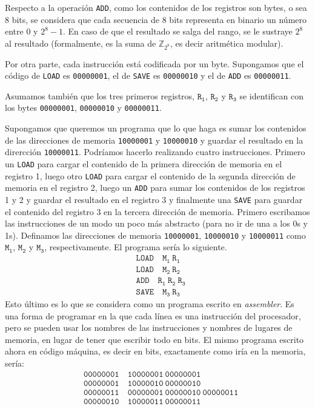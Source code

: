 \documentclass[a4paper, 12pt]{report}
\theoremstyle{definition}
\begin{document}
Respecto a la operación {\tt ADD}, como los contenidos de los registros son bytes, o sea 8 bits, se considera que cada secuencia de 8 bits representa en binario un número entre $0$ y $2^8-1$. En caso de que el resultado se salga del rango, se le sustraye $2^8$ al resultado (formalmente, es la suma de $\mathbb{Z}_{2^8}$, es decir aritmética modular).

Por otra parte, cada instrucción está codificada por un byte. Supongamos que el código de {\tt LOAD} es {\tt 00000001}, el de {\tt SAVE} es {\tt 00000010} y el de {\tt ADD} es {\tt 00000011}.

Asumamos también que los tres primeros registros, $\mathtt{R_1}$, $\mathtt{R_2}$ y $\mathtt{R_3}$ se identifican con los bytes {\tt 00000001}, {\tt 00000010} y {\tt 00000011}.

Supongamos que queremos un programa que lo que haga es sumar los contenidos de las direcciones de memoria {\tt 10000001} y {\tt 10000010} y guardar el resultado en la dirercción {\tt 10000011}. Podríamos hacerlo realizando cuatro instrucciones. Primero un {\tt LOAD} para cargar el contenido de la primera dirección de memoria en el registro 1, luego otro {\tt LOAD} para cargar el contenido de la segunda dirección de memoria en el registro 2, luego un {\tt ADD} para sumar los contenidos de los registros 1 y 2 y guardar el resultado en el registro 3 y finalmente una {\tt SAVE} para guardar el contenido del registro 3 en la tercera dirección de memoria. Primero escribamos las instrucciones de un modo un poco más abstracto (para no ir de una a los 0s y 1s).  Definamos las direcciones de memoria {\tt 10000001}, {\tt 10000010} y {\tt 10000011} como $\mathtt{M_1}$, $\mathtt{M_2}$ y $\mathtt{M_3}$, respectivamente. El programa sería lo siguiente.
\begin{align*}
	&\mathtt{LOAD} \quad\mathtt{M_1~R_1}\\
	&\mathtt{LOAD}  \quad\mathtt{M_2~R_2}\\
	&\mathtt{ADD}  \quad\mathtt{R_1~R_2~R_3}\\
	&\mathtt{SAVE}  \quad\mathtt{M_3~R_3}
\end{align*} 
Esto último es lo que se considera como un programa escrito en {\sl assembler}. Es una forma de programar en la que cada línea es una instrucción del procesador, pero se pueden usar los nombres de las instrucciones y nombres de lugares de memoria, en lugar de tener que escribir todo en bits. El mismo programa escrito ahora en código máquina, es decir en bits, exactamente como iría en la memoria, sería:
\begin{align*}
	&\mathtt{00000001} \quad\mathtt{10000001~00000001}\\
	&\mathtt{00000001}  \quad\mathtt{10000010~00000010}\\
	&\mathtt{00000011}  \quad\mathtt{00000001~00000010~00000011}\\
	&\mathtt{00000010}  \quad\mathtt{10000011~00000011}
\end{align*}
\end{document}
